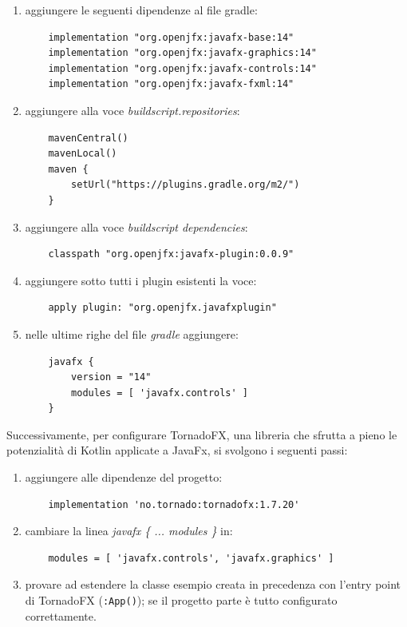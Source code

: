 \documentclass[12pt,a4paper,openright,oneside]{report}
\begin{document}
\begin{enumerate}
	\item aggiungere le seguenti dipendenze al file gradle:
	\begin{lstlisting}
	implementation "org.openjfx:javafx-base:14"
	implementation "org.openjfx:javafx-graphics:14"
	implementation "org.openjfx:javafx-controls:14"
	implementation "org.openjfx:javafx-fxml:14"
	\end{lstlisting}

	\item aggiungere alla voce \textit{buildscript.repositories}:
	\begin{lstlisting}
	mavenCentral()
	mavenLocal()
	maven {
		setUrl("https://plugins.gradle.org/m2/")
	}
	\end{lstlisting}

	\item aggiungere alla voce \textit{buildscript dependencies}:
	\begin{lstlisting}
	classpath "org.openjfx:javafx-plugin:0.0.9"
	\end{lstlisting}

	\item aggiungere sotto tutti i plugin esistenti la voce:
	\begin{lstlisting}
	apply plugin: "org.openjfx.javafxplugin"
	\end{lstlisting}

	\item nelle ultime righe del file \textit{gradle} aggiungere:
	\begin{lstlisting}
	javafx {
		version = "14"
		modules = [ 'javafx.controls' ]
	}
	\end{lstlisting}
\end{enumerate}

Successivamente, per configurare TornadoFX, una libreria che sfrutta a pieno le potenzialità di Kotlin applicate a JavaFx, si svolgono i seguenti passi:
\begin{enumerate}
	\item aggiungere alle dipendenze del progetto:
	\begin{lstlisting}
	implementation 'no.tornado:tornadofx:1.7.20'
	\end{lstlisting}

	\item cambiare la linea \textit{javafx \{ ... modules \}} in:
	\begin{lstlisting}
	modules = [ 'javafx.controls', 'javafx.graphics' ]
	\end{lstlisting}

	\item provare ad estendere la classe esempio creata in precedenza con l'entry point di TornadoFX (\texttt{:App()}); se il progetto parte è tutto configurato correttamente.
\end{enumerate}
\end{document}
